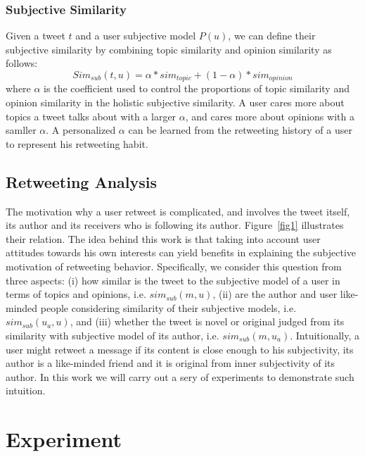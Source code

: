 \documentclass[letterpaper]{article}
\begin{document}
\subsubsection{Subjective Similarity}

Given a tweet $ t $ and a user subjective model $ P\left( u \right)  $, we can define their subjective similarity by combining topic similarity and opinion similarity as follows:
\begin{equation}
Sim_{sub} \left( t,u \right) = \alpha * sim_{topic}+\left( 1-\alpha \right)*sim_{opinion}
\end{equation}
where $ \alpha $ is the coefficient used to control the proportions of topic similarity and opinion similarity in the holistic subjective similarity. 
A user cares more about topics a tweet talks about with a larger $ \alpha $, and cares more about opinions with a samller $ \alpha $. 
A personalized $ \alpha $ can be learned from the retweeting history of a user to represent his retweeting habit. 

\subsection{Retweeting Analysis}
\label{analysis}
The motivation why a user retweet is complicated, and involves the tweet itself, its author and its receivers who is following its author. 
Figure~\ref{fig1} illustrates their relation. 
The idea behind this work is that taking into account user attitudes towards his own interests can yield benefits in explaining the subjective motivation of retweeting behavior. 
Specifically, we consider this question from three aspects: 
(i) how similar is the tweet to the subjective model of a user in terms of topics and opinions, i.e. $ sim_{sub} \left( m,u \right) $, (ii) are the author and user like-minded people considering similarity of their subjective models, i.e. $ sim_{sub}\left( u_{a},u \right)  $, and (iii) whether the tweet is novel or original judged from its similarity with subjective model of its author, i.e. $ sim_{sub}\left( m,u_{a} \right)  $. 
Intuitionally, a user might retweet a message if its content is close enough to his subjectivity, its author is a like-minded friend and it is original from inner subjectivity of its author. 
In this work we will carry out a sery of experiments to demonstrate such intuition.

\section{Experiment}
\label{experiment}
\end{document}
